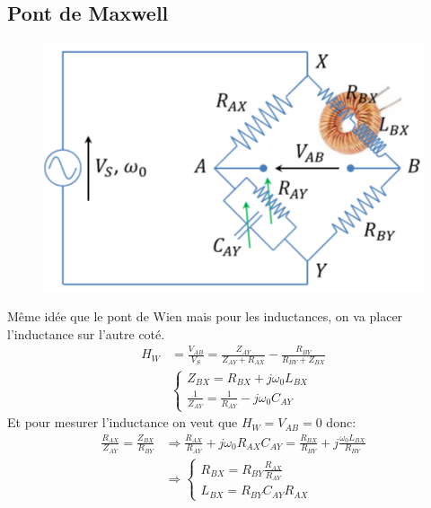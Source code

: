 \documentclass{report}
\begin{document}
\subsection{Pont de Maxwell}
\begin{figure}
\centering
\includegraphics{img/Maxwell.png}
\end{figure}
Même idée que le pont de Wien mais pour les inductances, on va placer l'inductance sur l'autre coté.
\begin{align*}
H_W &= \frac{V_{AB}}{V_S} = \frac{Z_{AY}}{Z_{AY} + R_{AX}} - \frac{R_{BY}}{R_{BY} + Z_{BX}}\\
& \begin{cases}
Z_{BX} = R_{BX} + j \omega_0 L_{BX}\\
\frac{1}{Z_{AY}} = \frac{1}{R_{AY}} - j \omega_0 C_{AY}
\end{cases}
\end{align*}
Et pour mesurer l'inductance on veut que $H_W = V_{AB} = 0$ donc:
\begin{align*}
\frac{R_{AX}}{Z_{AY}} = \frac{Z_{BX}}{R_{BY}} & \Longrightarrow \frac{R_{AX}}{R_{AY}} + j \omega_0 R_{AX} C_{AY} = \frac{R_{BX}}{R_{BY}} + j \frac{\omega_0 L_{BX}}{R_{BY}}\\
& \Longrightarrow \begin{cases}
R_{BX} = R_{BY}\frac{R_{AX}}{R_{AY}}\\
L_{BX} = R_{BY}C_{AY}R_{AX}
\end{cases}
\end{align*}
\end{document}

